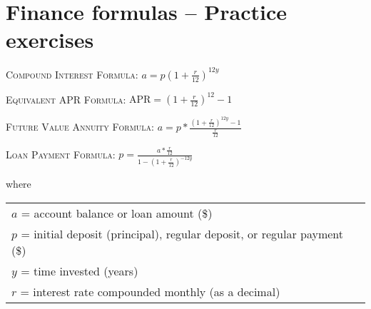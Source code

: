 
\section{Finance formulas  -- Practice exercises}

 \bigskip
 
\noindent \hrulefill

 \bigskip

\noindent \textsc{Compound Interest Formula:} \quad
$\displaystyle a = p \left( 1 + \frac{r}{12}\right) ^{12y}$ 

\bigskip

\noindent \textsc{Equivalent APR Formula:} \quad 
$\displaystyle \text{APR} = \left(1+\frac{r}{12}\right)^{12}-1$ 

\bigskip

\noindent  \textsc{Future Value Annuity Formula:} \quad
$\displaystyle a = p \ast \frac{\left( 1 + \frac{r}{12}\right) ^{12y}-1}{\frac{r}{12}}$ 

\bigskip

\noindent  \textsc{Loan Payment Formula:} \quad
$\displaystyle p = \frac{a  \ast \frac{r}{12}}{1-\left( 1 + \frac{r}{12}\right) ^{-12y}}$ 

\bigskip

\noindent  where 
\begin{center}
\begin{tabular} {l} 

$a$ = account balance or loan amount (\$) \\
$p$ = initial deposit (principal), regular deposit, or regular payment (\$) \\
$y$ = time invested (years)\\
$r$ = interest rate compounded monthly (as a decimal) \\ 
\end{tabular}
\end{center}

\noindent \hrulefill
\newpage %

